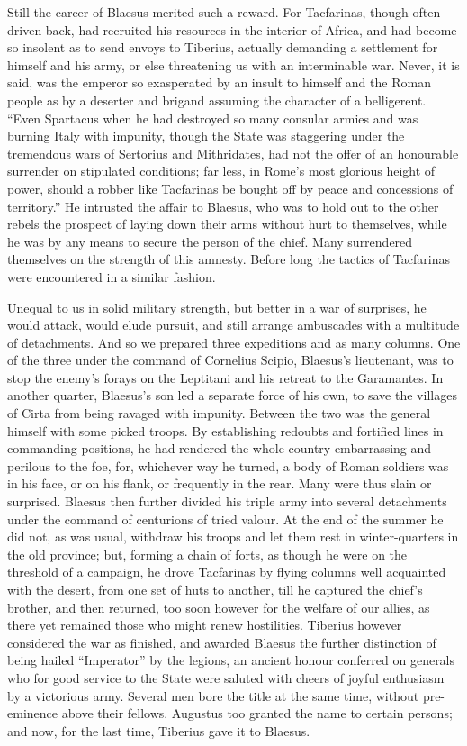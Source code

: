 
Still the career of Blaesus merited such a reward. For Tacfarinas, though often driven back, had recruited his resources in the interior of Africa, and had become so insolent as to send envoys to Tiberius, actually demanding a settlement for himself and his army, or else threatening us with an interminable war. Never, it is said, was the emperor so exasperated by an insult to himself and the Roman people as by a deserter and brigand assuming the character of a belligerent. ``Even Spartacus when he had destroyed so many consular armies and was burning Italy with impunity, though the State was staggering under the tremendous wars of Sertorius and Mithridates, had not the offer of an honourable surrender on stipulated conditions; far less, in Rome's most glorious height of power, should a robber like Tacfarinas be bought off by peace and concessions of territory.'' He intrusted the affair to Blaesus, who was to hold out to the other rebels the prospect of laying down their arms without hurt to themselves, while he was by any means to secure the person of the chief. Many surrendered themselves on the strength of this amnesty. Before long the tactics of Tacfarinas were encountered in a similar fashion.


Unequal to us in solid military strength, but better in a war of surprises, he would attack, would elude pursuit, and still arrange ambuscades with a multitude of detachments. And so we prepared three expeditions and as many columns. One of the three under the command of Cornelius Scipio, Blaesus's lieutenant, was to stop the enemy's forays on the Leptitani and his retreat to the Garamantes. In another quarter, Blaesus's son led a separate force of his own, to save the villages of Cirta from being ravaged with impunity. Between the two was the general himself with some picked troops. By establishing redoubts and fortified lines in commanding positions, he had rendered the whole country embarrassing and perilous to the foe, for, whichever way he turned, a body of Roman soldiers was in his face, or on his flank, or frequently in the rear. Many were thus slain or surprised. Blaesus then further divided his triple army into several detachments under the command of centurions of tried valour. At the end of the summer he did not, as was usual, withdraw his troops and let them rest in winter-quarters in the old province; but, forming a chain of forts, as though he were on the threshold of a campaign, he drove Tacfarinas by flying columns well acquainted with the desert, from one set of huts to another, till he captured the chief's brother, and then returned, too soon however for the welfare of our allies, as there yet remained those who might renew hostilities. Tiberius however considered the war as finished, and awarded Blaesus the further distinction of being hailed ``Imperator'' by the legions, an ancient honour conferred on generals who for good service to the State were saluted with cheers of joyful enthusiasm by a victorious army. Several men bore the title at the same time, without pre-eminence above their fellows. Augustus too granted the name to certain persons; and now, for the last time, Tiberius gave it to Blaesus.

